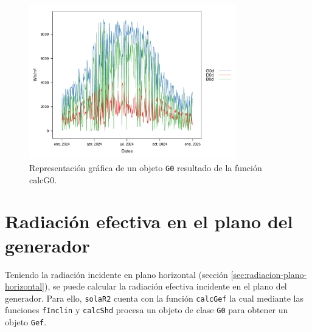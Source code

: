 \begin{itemize}
\begin{figure}[!htb]
\centering
\includegraphics[width=0.8\textwidth]{figuras/codigo-calcg0.pdf}
\caption{Representación gráfica de un objeto \texttt{G0} resultado de la función calcG0.}
\end{figure}
\end{itemize}

\section{Radiación efectiva en el plano del generador}
\label{sec:orgb6363bc}
\label{sec:radiacion-efectiva-plano-generador}
Teniendo la radiación incidente en plano horizontal (sección \ref{sec:radiacion-plano-horizontal}), se puede calcular la radiación efectiva incidente en el plano del generador. Para ello, \texttt{solaR2} cuenta con la función \texttt{calcGef} la cual mediante las funciones \texttt{fInclin} y \texttt{calcShd} procesa un objeto de clase \texttt{G0} para obtener un objeto \texttt{Gef}.

